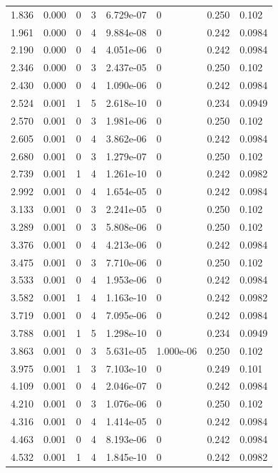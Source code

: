 \documentclass[preview]{standalone}
\begin{document}
{{\begin{tabular}{L{1.2cm}C{1.2cm} C{0.3cm}C{0.5cm} C{1.4cm}C{1.4cm} C{1.4cm}C{1.4cm}}
  1.836  &  0.000  & 0     &  3 &  6.729e-07  & 0  & 0.250 &  0.102   \\ 
  1.961  &  0.000  & 0     &  4 &  9.884e-08  & 0  & 0.242 &  0.0984   \\ 
  2.190  &  0.000  & 0     &  4 &  4.051e-06  & 0  & 0.242 &  0.0984   \\ 
  2.346  &  0.000  & 0     &  3 &  2.437e-05  & 0  & 0.250 &  0.102   \\ 
  2.430  &  0.000  & 0     &  4 &  1.090e-06  & 0  & 0.242 &  0.0984   \\ 
  2.524  &  0.001  & 1     &  5 &  2.618e-10  & 0  & 0.234 &  0.0949   \\ 
  2.570  &  0.001  & 0     &  3 &  1.981e-06  & 0  & 0.250 &  0.102   \\ 
  2.605  &  0.001  & 0     &  4 &  3.862e-06  & 0  & 0.242 &  0.0984   \\ 
  2.680  &  0.001  & 0     &  3 &  1.279e-07  & 0  & 0.250 &  0.102   \\ 
  2.739  &  0.001  & 1     &  4 &  1.261e-10  & 0  & 0.242 &  0.0982   \\ 
  2.992  &  0.001  & 0     &  4 &  1.654e-05  & 0  & 0.242 &  0.0984   \\ 
  3.133  &  0.001  & 0     &  3 &  2.241e-05  & 0  & 0.250 &  0.102   \\ 
  3.289  &  0.001  & 0     &  3 &  5.808e-06  & 0  & 0.250 &  0.102   \\ 
  3.376  &  0.001  & 0     &  4 &  4.213e-06  & 0  & 0.242 &  0.0984   \\ 
  3.475  &  0.001  & 0     &  3 &  7.710e-06  & 0  & 0.250 &  0.102   \\ 
  3.533  &  0.001  & 0     &  4 &  1.953e-06  & 0  & 0.242 &  0.0984   \\ 
  3.582  &  0.001  & 1     &  4 &  1.163e-10  & 0  & 0.242 &  0.0982   \\ 
  3.719  &  0.001  & 0     &  4 &  7.095e-06  & 0  & 0.242 &  0.0984   \\ 
  3.788  &  0.001  & 1     &  5 &  1.298e-10  & 0  & 0.234 &  0.0949   \\ 
  3.863  &  0.001  & 0     &  3 &  5.631e-05  & 1.000e-06  & 0.250 &  0.102   \\ 
  3.975  &  0.001  & 1     &  3 &  7.103e-10  & 0  & 0.249 &  0.101   \\ 
  4.109  &  0.001  & 0     &  4 &  2.046e-07  & 0  & 0.242 &  0.0984   \\ 
  4.210  &  0.001  & 0     &  3 &  1.076e-06  & 0  & 0.250 &  0.102   \\ 
  4.316  &  0.001  & 0     &  4 &  1.414e-05  & 0  & 0.242 &  0.0984   \\ 
  4.463  &  0.001  & 0     &  4 &  8.193e-06  & 0  & 0.242 &  0.0984   \\ 
  4.532  &  0.001  & 1     &  4 &  1.845e-10  & 0  & 0.242 &  0.0982   \\ 
\hline 
\end{tabular} 

}}
\end{document}
